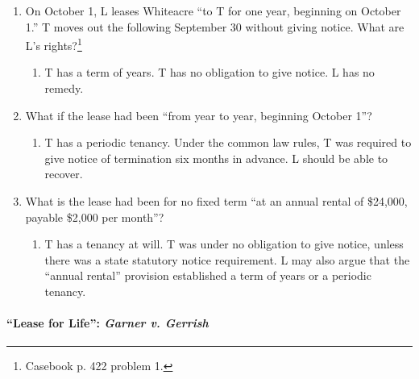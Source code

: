\begin{enumerate}
    \item On October 1, L leases Whiteacre ``to T for one year, beginning on 
    October 1.'' T moves out the following September 30 without giving notice. 
    What are L's rights?\footnote{Casebook p. 422 problem 1.}
    \begin{enumerate}
        \item T has a term of years. T has no obligation to give notice. L has 
        no remedy.
    \end{enumerate}
    \item What if the lease had been ``from year to year, beginning October 1''?
    \begin{enumerate}
        \item T has a periodic tenancy. Under the common law rules, T was 
        required to give notice of termination six months in advance. L should 
        be able to recover.
    \end{enumerate}
    \item What is the lease had been for no fixed term ``at an annual rental 
    of \$24,000, payable \$2,000 per month''?
    \begin{enumerate}
        \item T has a tenancy at will. T was under no obligation to give 
        notice, unless there was a state statutory notice requirement. L may 
        also argue that the ``annual rental'' provision established a term of 
        years or a periodic tenancy.
    \end{enumerate}
\end{enumerate}

\paragraph{``Lease for Life'': \emph{Garner v. Gerrish}}

